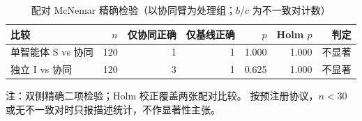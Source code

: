 \begin{table}[t]
\centering
\caption{配对 McNemar 精确检验（以协同臂为处理组；$b$/$c$ 为不一致对计数）}
\label{tab:mcnemar}
\footnotesize
\setlength{\tabcolsep}{3pt}
\begin{tabular}{lrrrrrr}
\toprule
比较 & $n$ & 仅协同正确 & 仅基线正确 & $p$ & Holm $p$ & 判定 \\
\midrule
单智能体 S vs 协同 & 120 & 1 & 1 & 1.000 & 1.000 & 不显著 \\
独立 I vs 协同 & 120 & 3 & 1 & 0.625 & 1.000 & 不显著 \\
\bottomrule
\end{tabular}
\par\smallskip
\raggedright\scriptsize
注：双侧精确二项检验；Holm 校正覆盖两张配对比较。
按预注册协议，$n<30$ 或无不一致对时只报描述统计，不作显著性主张。
\end{table}
